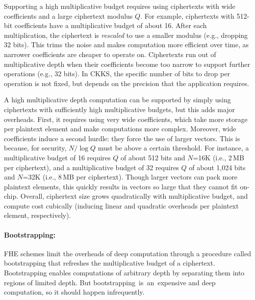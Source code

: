 Supporting a high multiplicative budget requires using ciphertexts with wide
coefficients and a large ciphertext modulus $Q$.
For example, ciphertexts with 512-bit coefficients have a multiplicative budget of about 16.
After each multiplication, the ciphertext is \emph{rescaled} to use a smaller modulus
(e.g., dropping 32 bits).
This trims the noise and makes computation more efficient over time, as
narrower coefficients are cheaper to operate on.
Ciphertexts run out of multiplicative depth when their coefficients become too
narrow to support further operations (e.g., 32 bits).
In CKKS, the specific number of bits to drop per operation is not fixed, but depends on the precision
that the application requires.

A high multiplicative depth computation can be supported by simply using ciphertexts with
sufficiently high multiplicative budgets, but this adds major overheads.
First, it requires using very wide coefficients, which take more storage per plaintext element and make computations more complex.
Moreover, wide coefficients induce a second hurdle: they force the use of larger vectors.
This is because, for security, $N/\log Q$ must be above a certain threshold.
For instance, a multiplicative budget of 16 requires $Q$ of about 512 bits and $N$=16K (i.e., 2\,MB per ciphertext),
and a multiplicative budget of 32 requires $Q$ of about 1,024 bits and $N$=32K (i.e., 8\,MB per ciphertext).
Though larger vectors can pack more plaintext elements, %
this quickly results in vectors so large that they cannot fit on-chip.
Overall, ciphertext size grows quadratically with multiplicative budget, and compute cost cubically
(inducing linear and quadratic overheads per plaintext element, respectively).


\figBootstrapping

\paragraph{Bootstrapping:} FHE schemes limit the overheads of deep computation
through a procedure called bootstrapping that refreshes the multiplicative budget of a ciphertext.
Bootstrapping enables computations of arbitrary depth by separating them into regions of limited depth.
But bootstrapping~is~an~expensive and deep computation,
so it should happen infrequently.

